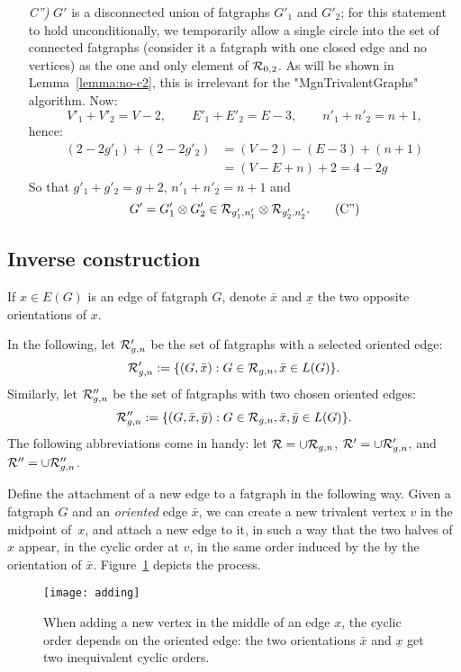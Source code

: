 \begin{enumerate}
\item[\slshape C'')] $G'$ is a disconnected union of fatgraphs $G'_1$ and
  $G'_2$; for this statement to hold unconditionally, we temporarily allow a
  single circle into the set of connected fatgraphs (consider it a fatgraph
  with one closed edge and no vertices) as the one and only element of
  $\mathcal{R}_{0,2}$.  As will be shown in Lemma~\ref{lemma:no-c2}, this is
  irrelevant for the "MgnTrivalentGraphs" algorithm.  Now:
  \begin{equation*} V'_1 + V'_2 = V -2, 
    \qquad E'_1 + E'_2 = E - 3,
    \qquad n'_1 + n'_2 = n + 1,
  \end{equation*} hence:
\begin{align*} 
  (2- 2g'_1) + (2-2g'_2) &= (V-2) - (E-3) + (n+1) 
  \\ 
  &= (V-E+n) + 2 = 4 - 2g
\end{align*} 
So that $g'_1 + g'_2 = g + 2$, $n'_1 + n'_2 = n+1$ and
\begin{equation} 
  G'= G'_1 \otimes G'_2 \in \mathcal{R}_{g'_1, n'_1} \otimes \mathcal{R}_{g'_2, n'_2}.
  \label{eq:C''}\tag{C''}
\end{equation}
\end{enumerate}

\subsection{Inverse construction}
\label{sec:addition}

If $x \in E(G)$ is an edge of fatgraph $G$, denote $\bar{x}$ and
$\underline{x}$ the two opposite orientations of $x$.

In the following, let $\mathcal{R}'_{g,n}$ be the set of fatgraphs with a
selected oriented edge:
\begin{equation*}
  \mathcal{R}'_{g,n} := \{ (G,\bar x) : G \in \mathcal{R}_{g,n}, \bar{x} \in L(G)\}.
\end{equation*}
Similarly, let $\mathcal{R}''_{g,n}$ be the set of fatgraphs with two
chosen oriented edges:
\begin{equation*}
  \mathcal{R}''_{g,n} := \{ (G, \bar x, \bar y) : G \in \mathcal{R}_{g,n}, 
                   \bar{x}, \bar{y} \in L(G) \}.
\end{equation*}
The following abbreviations come in handy: let $\mathcal{R} = \cup \mathcal{R}_{g,n}$,
$\mathcal{R}' = \cup \mathcal{R}'_{g,n}$, and $\mathcal{R}'' = \cup \mathcal{R}''_{g,n}$.

Define the attachment of a new edge to a fatgraph in the following
way.  Given a fatgraph $G$ and an \emph{oriented} edge $\bar{x}$, we
can create a new trivalent vertex $v$ in the midpoint of~$x$, and
attach a new edge to it, in such a way that the two halves of $x$
appear, in the cyclic order at $v$, in the same order induced by the
by the orientation of $\bar{x}$.  Figure~\ref{fig:adding} depicts the process.
\begin{figure}
  \centering
  \texttt{[image: adding]}
  \caption{When adding a new vertex in the middle of an edge $x$, the cyclic order depends on the oriented edge: the two orientations $\bar{x}$ and $\underline{x}$ get two inequivalent cyclic orders.}
  \label{fig:adding}
\end{figure}

